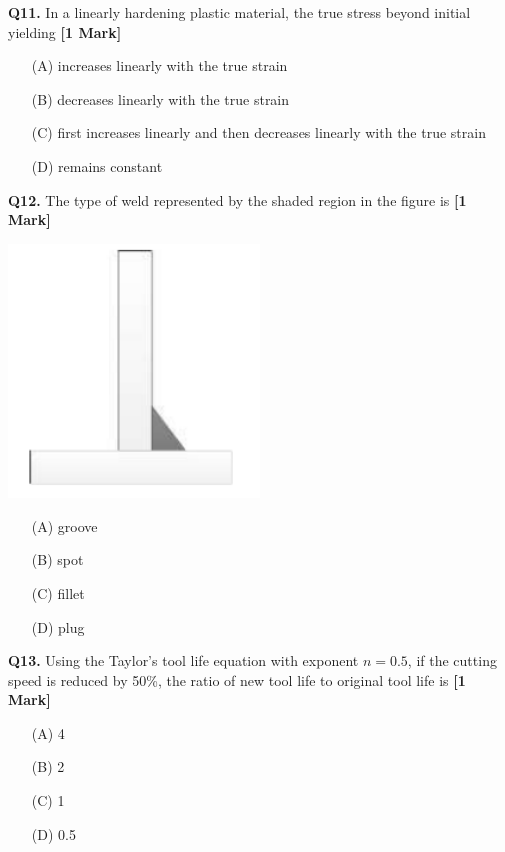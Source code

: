 \documentclass[11pt]{article}
\newcommand{\questiona}[2]{
    \noindent\textbf{Q#2.} #1 \hfill \textbf{[1 Mark]}
}
\begin{document}
\questiona{In a linearly hardening plastic material, the true stress beyond initial yielding}{11}
\begin{enumerate}
    \item[(A)] increases linearly with the true strain
    \item[(B)] decreases linearly with the true strain
    \item[(C)] first increases linearly and then decreases linearly with the true strain
    \item[(D)] remains constant
\end{enumerate}
\vspace{0.5cm}

\questiona{The type of weld represented by the shaded region in the figure is}{12}
\begin{center}
\includegraphics[width=0.5\textwidth]{figures/12.png}
\end{center}
\begin{enumerate}
    \item[(A)] groove
    \item[(B)] spot
    \item[(C)] fillet
    \item[(D)] plug
\end{enumerate}
\vspace{0.5cm}

\questiona{Using the Taylor’s tool life equation with exponent \( n = 0.5 \), if the cutting speed is reduced by 50\%, the ratio of new tool life to original tool life is}{13}
\begin{enumerate}
    \item[(A)] 4
    \item[(B)] 2
    \item[(C)] 1
    \item[(D)] 0.5
\end{enumerate}
\vspace{0.5cm}
\end{document}
